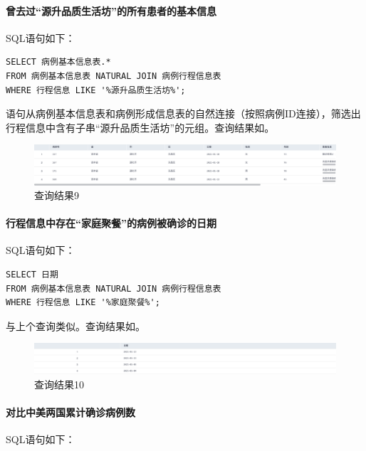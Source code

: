 \documentclass[lang=cn,11pt,a4paper,cite=authornum]{paper}
\begin{document}
\paragraph{曾去过“源升品质生活坊”的所有患者的基本信息} SQL语句如下：

\begin{code}
\begin{verbatim}
SELECT 病例基本信息表.*
FROM 病例基本信息表 NATURAL JOIN 病例行程信息表
WHERE 行程信息 LIKE '%源升品质生活坊%';
\end{verbatim}
\end{code}

语句从病例基本信息表和病例形成信息表的自然连接（按照病例ID连接），筛选出行程信息中含有子串“源升品质生活坊”的元组。查询结果如。

\begin{figure}[!htb]
    \centering
    \includegraphics[width=\textwidth]{./images/lab1_query9.png}
    \caption{查询结果9\label{fig:query9}}
\end{figure}

\paragraph{行程信息中存在“家庭聚餐”的病例被确诊的日期} SQL语句如下：

\begin{code}
\begin{verbatim}
SELECT 日期
FROM 病例基本信息表 NATURAL JOIN 病例行程信息表
WHERE 行程信息 LIKE '%家庭聚餐%';
\end{verbatim}
\end{code}

与上个查询类似。查询结果如。

\begin{figure}[!htb]
    \centering
    \includegraphics[width=\textwidth]{./images/lab1_query10.png}
    \caption{查询结果10\label{fig:query10}}
\end{figure}

\paragraph{对比中美两国累计确诊病例数} SQL语句如下：
\end{document}
